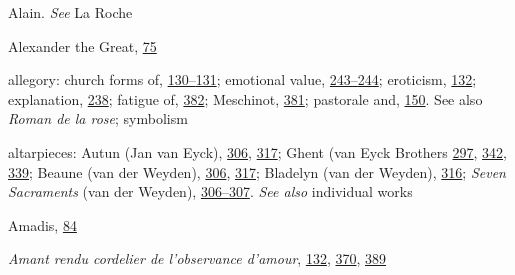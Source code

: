 Alain. \emph{See} La Roche

Alexander the Great,
\protect\hyperlink{10_Chapter_Three__THE_HEROIC_DREAM.xhtmlux5cux23page_75}{75}

allegory: church forms of,
\protect\hyperlink{11_Chapter_Four__THE_FORMS_OF_LOVE.xhtmlux5cux23page_130}{130--}\protect\hyperlink{11_Chapter_Four__THE_FORMS_OF_LOVE.xhtmlux5cux23page_131}{131};
emotional value,
\protect\hyperlink{16_Chapter_Nine__THE_DECLINE_OF_SYM.xhtmlux5cux23page_243}{243--}\protect\hyperlink{16_Chapter_Nine__THE_DECLINE_OF_SYM.xhtmlux5cux23page_244}{244};
eroticism,
\protect\hyperlink{11_Chapter_Four__THE_FORMS_OF_LOVE.xhtmlux5cux23page_132}{132};
explanation,
\protect\hyperlink{16_Chapter_Nine__THE_DECLINE_OF_SYM.xhtmlux5cux23page_238}{238};
fatigue of,
\protect\hyperlink{22_Chapter_Fourteen__THE_COMING_OF.xhtmlux5cux23page_382}{382};
Meschinot,
\protect\hyperlink{21_Chapter_Thirteen__IMAGE_AND_WORD.xhtmlux5cux23page_381}{381};
pastorale and,
\protect\hyperlink{11_Chapter_Four__THE_FORMS_OF_LOVE.xhtmlux5cux23page_150}{150}.
See also \emph{Roman de la rose}; symbolism

altarpieces: Autun (Jan van Eyck),
\protect\hyperlink{20_ILLUSTRATIONS_FOLLOW_PAGE.xhtmlux5cux23page_306}{306},
\protect\hyperlink{20_ILLUSTRATIONS_FOLLOW_PAGE.xhtmlux5cux23page_317}{317};
Ghent (van Eyck Brothers
\protect\hyperlink{19_Chapter_Twelve__ART_IN_LIFE.xhtmlux5cux23page_297}{297},
\protect\hyperlink{21_Chapter_Thirteen__IMAGE_AND_WORD.xhtmlux5cux23page_342}{342},
\protect\hyperlink{21_Chapter_Thirteen__IMAGE_AND_WORD.xhtmlux5cux23page_339}{339};
Beaune (van der Weyden),
\protect\hyperlink{20_ILLUSTRATIONS_FOLLOW_PAGE.xhtmlux5cux23page_306}{306},
\protect\hyperlink{20_ILLUSTRATIONS_FOLLOW_PAGE.xhtmlux5cux23page_317}{317};
Bladelyn (van der Weyden),
\protect\hyperlink{20_ILLUSTRATIONS_FOLLOW_PAGE.xhtmlux5cux23page_316}{316};
\emph{Seven Sacraments} (van der Weyden),
\protect\hyperlink{20_ILLUSTRATIONS_FOLLOW_PAGE.xhtmlux5cux23page_306}{306--}\protect\hyperlink{20_ILLUSTRATIONS_FOLLOW_PAGE.xhtmlux5cux23page_307}{307}.
\emph{See also} individual works

Amadis,
\protect\hyperlink{10_Chapter_Three__THE_HEROIC_DREAM.xhtmlux5cux23page_84}{84}

\emph{Amant rendu cordelier de l'observance d'amour},
\protect\hyperlink{11_Chapter_Four__THE_FORMS_OF_LOVE.xhtmlux5cux23page_132}{132},
\protect\hyperlink{21_Chapter_Thirteen__IMAGE_AND_WORD.xhtmlux5cux23page_370}{370},
\protect\hyperlink{22_Chapter_Fourteen__THE_COMING_OF.xhtmlux5cux23page_389}{389}

